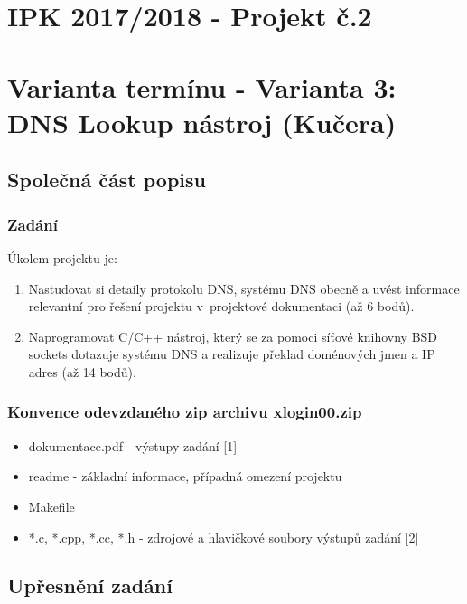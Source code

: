 \documentclass[11pt, a4paper, titlepage]{article}
\begin{document}
\section*{IPK 2017/2018 - Projekt č.2}

\section*{Varianta termínu - Varianta 3: DNS Lookup nástroj (Kučera)}
\bigskip



\subsection*{Společná část popisu}

\subsubsection*{\textbf{Zadání}}

Úkolem projektu je:

\begin{enumerate}
	\item Nastudovat si detaily protokolu DNS, systému DNS obecně a uvést informace relevantní pro řešení projektu v~projektové dokumentaci (až 6 bodů).
	\item Naprogramovat C/C++ nástroj, který se za pomoci síťové knihovny BSD sockets dotazuje systému DNS a realizuje překlad doménových jmen a IP adres (až 14 bodů).
\end{enumerate}

\subsubsection*{\textbf{Konvence odevzdaného zip archivu xlogin00.zip}}

\begin{itemize}
	\item dokumentace.pdf - výstupy zadání [1]
	\item readme - základní informace, případná omezení projektu
	\item Makefile
	\item *.c, *.cpp, *.cc, *.h - zdrojové a hlavičkové soubory výstupů zadání [2]
\end{itemize}



\subsection*{Upřesnění zadání}
\end{document}
